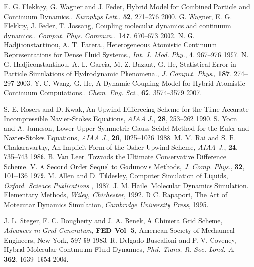 \documentclass{CFD2010paper}
\begin{document}
\begin{thebibliography}{99}
 E. G. Flekk$\phi$y, G. Wagner and J. Feder, Hybrid Model for Combined Particle and Continuum Dynamics., \textit{Europhys Lett.}, \textbf{52}, 271--276 {2000}.
 G. Wagner, E. G. Flekkoy, J. Feder, T. Jossang, Coupling molecular dynamics and continuum dynamics., \textit{Comput. Phys. Commun.}, \textbf{147}, 670--673 {2002}.
 N. G. Hadjiconstantinou, A. T. Patera., Heterogeneous Atomistic Continuum Representations for Dense Fluid Systems., \textit{ Int. J. Mod. Phy.}, \textbf{4},  967--976 {1997}.
 N. G. Hadjiconstantinou, A. L. Garcia, M. Z. Bazant, G. He, Statistical Error in Particle Simulations of Hydrodynamic Phenomena., \textit{J. Comput. Phys.}, \textbf{187}, 274--297 {2003}.
 Y. C. Wang, G. He, A Dynamic Coupling Model for Hybrid Atomistic-Continuum Computations., \textit{Chem. Eng. Sci.}, \textbf{62}, 3574--3579 {2007}.

 S. E. Rosers and D. Kwak, An Upwind Differecing Scheme for the Time-Accurate Incompressible Navier-Stokes Equations, \textit{AIAA J.}, \textbf{28}, 253--262 {1990}.
 S. Yoon and A. Jameson, Lower-Upper Symmetric-Gauss-Seidel Method for the Euler and Navier-Stokes Equations, \textit{AIAA J.}, \textbf{26}, 1025--1026 {1988}.
 M. M. Rai and S. R. Chakaravarthy, An Implicit Form of the Osher Upwind Scheme, \textit{AIAA J.}, \textbf{24}, 735--743 {1986}.
 B. Van Leer, Towards the Ultimate Conservative Difference Scheme. V. A Second Order Sequel to Godunov's Methods, \textit{J. Comp. Phys.}, \textbf{32}, 101--136 {1979}.
 M. Allen and D. Tildesley, Computer Simulation of Liquids, \textit{Oxford. Science Publications }, {1987}.
  J. M. Haile, Molecular Dynamics Simulation. Elementary Methods, \textit{Wiley, Chichester}, {1992}.
 D C. Rapaport, The Art of Motecutar Dynamics Simulation, \textit{Cambridge University Press}, {1995}.

 J. L. Steger, F. C. Dougherty and J. A. Benek, A Chimera Grid Scheme, \textit{Advances in Grid Generation}, \textbf{FED Vol. 5}, American Society of Mechanical Engineers, New York, 59?-69 {1983}.
 R. Delgado-Buscalioni and P. V. Coveney, Hybrid Molecular-Continuum Fluid Dynamics, \textit{Phil. Trans. R. Soc. Lond. A}, \textbf{362}, 1639--1654 {2004}.

\end{thebibliography}
\end{document}
